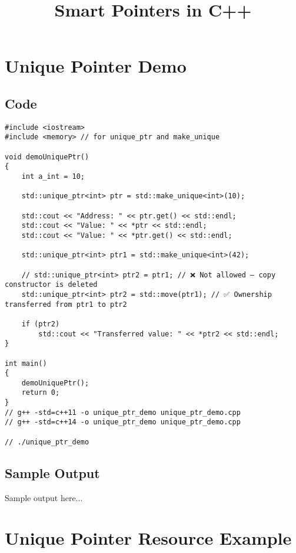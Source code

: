 \documentclass[12pt]{article}
\title{Smart Pointers in C++}
\author{}
\date{}
\begin{document}
\maketitle
\tableofcontents
\newpage

\section*{Unique Pointer Demo}

\subsection*{Code}
\begin{Verbatim}[fontsize=\small,frame=single]
#include <iostream>
#include <memory> // for unique_ptr and make_unique

void demoUniquePtr()
{
    int a_int = 10;

    std::unique_ptr<int> ptr = std::make_unique<int>(10);

    std::cout << "Address: " << ptr.get() << std::endl;
    std::cout << "Value: " << *ptr << std::endl;
    std::cout << "Value: " << *ptr.get() << std::endl;

    std::unique_ptr<int> ptr1 = std::make_unique<int>(42);

    // std::unique_ptr<int> ptr2 = ptr1; // ❌ Not allowed — copy constructor is deleted
    std::unique_ptr<int> ptr2 = std::move(ptr1); // ✅ Ownership transferred from ptr1 to ptr2

    if (ptr2)
        std::cout << "Transferred value: " << *ptr2 << std::endl;
}

int main()
{
    demoUniquePtr();
    return 0;
}
// g++ -std=c++11 -o unique_ptr_demo unique_ptr_demo.cpp
// g++ -std=c++14 -o unique_ptr_demo unique_ptr_demo.cpp

// ./unique_ptr_demo
\end{Verbatim}

\subsection*{Sample Output}
\begin{tcolorbox}[colback=black!5!white,colframe=black!75!white]
Sample output here...
\end{tcolorbox}
\newpage

\section*{Unique Pointer Resource Example}
\end{document}
